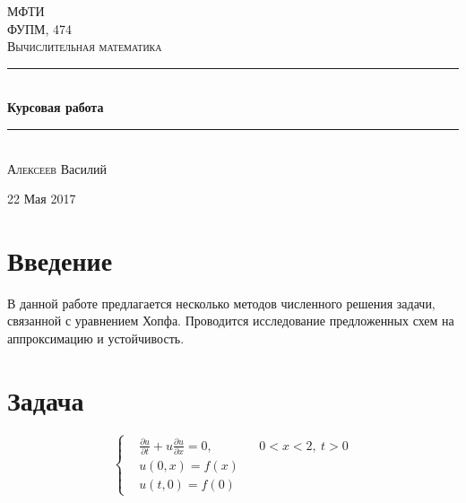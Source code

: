 \documentclass[a4paper,12pt]{article}
\begin{document}
\begin{titlepage}

\newcommand{\HRule}{\rule{\linewidth}{0.5mm}} %

\center %

\textsc{\LARGE МФТИ}\\[0.5cm]
\textsc{\Large ФУПМ, 474}\\[0.5cm] %
\textsc{\large Вычислительная математика}\\[1.5cm] %

\vspace{3cm}

\HRule \\[0.4cm]
{ \huge \bfseries Курсовая работа}\\[0.3cm] %
\HRule \\[1.5cm]

\Large %
\textsc{Алексеев} Василий\\[3cm]

\vspace{\fill}

{\large 22 Мая 2017}\\[0.2cm] %

\end{titlepage}

  
  
{
\hypersetup{linkcolor=black}
\tableofcontents
}		
  \newpage

\section{Введение}
  В данной работе предлагается несколько методов численного решения задачи, связанной с уравнением Хопфа.
  Проводится исследование предложенных схем на аппроксимацию и устойчивость.
  
\section{Задача}
  \begin{equation}
    \left\{
    \begin{aligned}
      &\frac{\partial u}{\partial t} + u \frac{\partial u}{\partial x} = 0, & &0 < x < 2,\ t > 0\\
      &u(0, x) = f(x) & &{}\\
      &u(t, 0) = f(0) & &{}
    \end{aligned}
    \right.
    \label{eq:task}
  \end{equation}
  
\end{document}
